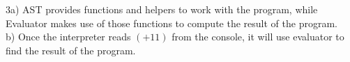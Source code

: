 \documentclass[12pt]{article}
\begin{document}
\noindent 3a) AST provides functions and helpers to work with the program, while Evaluator makes use of those functions to compute the result of the program. \\

\noindent b) Once the interpreter reads $(+1 1)$ from the console, it will use evaluator to find the result of the program.

\end{document}
